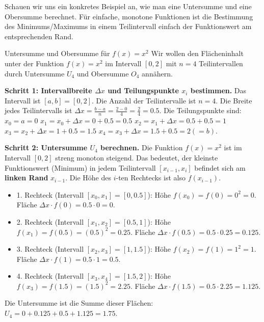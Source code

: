 Schauen wir uns ein konkretes Beispiel an, wie man eine Untersumme und eine Obersumme berechnet. Für einfache, monotone Funktionen ist die Bestimmung des Minimums/Maximums in einem Teilintervall einfach der Funktionswert am entsprechenden Rand.

\begin{beispielumgebung}{Untersumme und Obersumme für $f(x)=x^2$}
Wir wollen den Flächeninhalt unter der Funktion $f(x)=x^2$ im Intervall $[0,2]$ mit $n=4$ Teilintervallen durch Untersumme $U_4$ und Obersumme $O_4$ annähern.

\textbf{Schritt 1: Intervallbreite $\Delta x$ und Teilungspunkte $x_i$ bestimmen.}
Das Intervall ist $[a,b] = [0,2]$. Die Anzahl der Teilintervalle ist $n=4$.
Die Breite jedes Teilintervalls ist $\Delta x = \frac{b-a}{n} = \frac{2-0}{4} = \frac{2}{4} = 0.5$.
Die Teilungspunkte sind:
$x_0 = a = 0$
$x_1 = x_0 + \Delta x = 0 + 0.5 = 0.5$
$x_2 = x_1 + \Delta x = 0.5 + 0.5 = 1$
$x_3 = x_2 + \Delta x = 1 + 0.5 = 1.5$
$x_4 = x_3 + \Delta x = 1.5 + 0.5 = 2 (=b)$.

\textbf{Schritt 2: Untersumme $U_4$ berechnen.}
Die Funktion $f(x)=x^2$ ist im Intervall $[0,2]$ streng monoton steigend. Das bedeutet, der kleinste Funktionswert (Minimum) in jedem Teilintervall $[x_{i-1}, x_i]$ befindet sich am \textbf{linken Rand} $x_{i-1}$. Die Höhe des $i$-ten Rechtecks ist also $f(x_{i-1})$.
\begin{itemize}
    \item 1. Rechteck (Intervall $[x_0, x_1] = [0, 0.5]$): Höhe $f(x_0) = f(0) = 0^2 = 0$. Fläche $\Delta x \cdot f(0) = 0.5 \cdot 0 = 0$.
    \item 2. Rechteck (Intervall $[x_1, x_2] = [0.5, 1]$): Höhe $f(x_1) = f(0.5) = (0.5)^2 = 0.25$. Fläche $\Delta x \cdot f(0.5) = 0.5 \cdot 0.25 = 0.125$.
    \item 3. Rechteck (Intervall $[x_2, x_3] = [1, 1.5]$): Höhe $f(x_2) = f(1) = 1^2 = 1$. Fläche $\Delta x \cdot f(1) = 0.5 \cdot 1 = 0.5$.
    \item 4. Rechteck (Intervall $[x_3, x_4] = [1.5, 2]$): Höhe $f(x_3) = f(1.5) = (1.5)^2 = 2.25$. Fläche $\Delta x \cdot f(1.5) = 0.5 \cdot 2.25 = 1.125$.
\end{itemize}
Die Untersumme ist die Summe dieser Flächen:
$U_4 = 0 + 0.125 + 0.5 + 1.125 = 1.75$.


\end{beispielumgebung}
